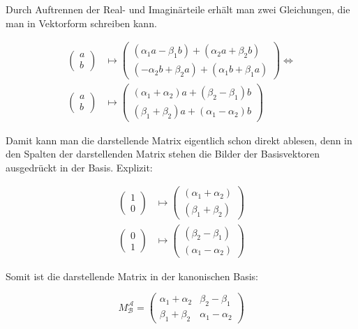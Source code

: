 \documentclass[a4paper,german,12pt,smallheadings]{scrartcl}
\begin{document}
Durch Auftrennen der Real- und Imaginärteile erhält man zwei Gleichungen, die
man in Vektorform schreiben kann.

\begin{align*}
  \begin{pmatrix} a \\ b \end{pmatrix} &\mapsto \begin{pmatrix} (\alpha_1a-\beta_1b) + (\alpha_2a+\beta_2b) \\ (-\alpha_2b+\beta_2a) + (\alpha_1b + \beta_1a) \end{pmatrix} \Leftrightarrow \\
  \begin{pmatrix} a \\ b \end{pmatrix} &\mapsto \begin{pmatrix} (\alpha_1+\alpha_2)a + (\beta_2 - \beta_1)b \\ (\beta_1+\beta_2)a + (\alpha_1-\alpha_2)b \end{pmatrix}
\end{align*}

Damit kann man die darstellende Matrix eigentlich schon direkt ablesen, denn in
den Spalten der darstellenden Matrix stehen die Bilder der Basisvektoren
ausgedrückt in der Basis. Explizit:

\begin{align*}
  \begin{pmatrix} 1 \\ 0 \end{pmatrix} &\mapsto \begin{pmatrix} (\alpha_1+\alpha_2) \\ (\beta_1+\beta_2) \end{pmatrix} \\
  \begin{pmatrix} 0 \\ 1 \end{pmatrix} &\mapsto \begin{pmatrix} (\beta_2 - \beta_1) \\ (\alpha_1-\alpha_2) \end{pmatrix}
\end{align*}

Somit ist die darstellende Matrix in der kanonischen Basis:

\begin{equation}
  M_{\mathcal{B}}^{\mathcal{A}} = \begin{pmatrix} \alpha_1+\alpha_2 & \beta_2 - \beta_1 \\ \beta_1+\beta_2 & \alpha_1-\alpha_2 \end{pmatrix}
\end{equation}
\end{document}

